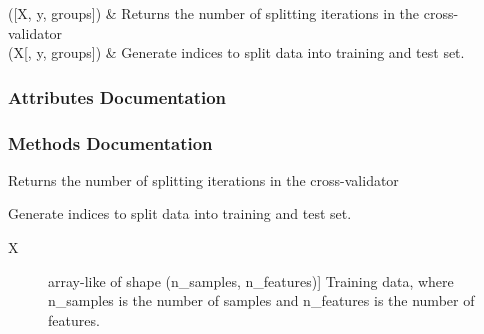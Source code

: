 \documentclass[letterpaper,10pt,english]{sphinxmanual}
\begin{document}
\begin{fulllineitems}
\begin{savenotes}
\begin{longtable}[c]{}
\endlastfoot

{\hyperref[\detokenize{api/mastml.data_splitters.Bootstrap:mastml.data_splitters.Bootstrap.get_n_splits}]{}}({[}X, y, groups{]})
&
Returns the number of splitting iterations in the cross-validator
\\
\hline
{\hyperref[\detokenize{api/mastml.data_splitters.Bootstrap:mastml.data_splitters.Bootstrap.split}]{}}(X{[}, y, groups{]})
&
Generate indices to split data into training and test set.
\\
\hline
\end{longtable}\sphinxatlongtableend\end{savenotes}
\subsubsection*{Attributes Documentation}

\begin{fulllineitems}
\label{\detokenize{api/mastml.data_splitters.Bootstrap:mastml.data_splitters.Bootstrap.indices}}
\end{fulllineitems}

\subsubsection*{Methods Documentation}

\begin{fulllineitems}
\label{\detokenize{api/mastml.data_splitters.Bootstrap:mastml.data_splitters.Bootstrap.get_n_splits}}
Returns the number of splitting iterations in the cross-validator

\end{fulllineitems}


\begin{fulllineitems}
\label{\detokenize{api/mastml.data_splitters.Bootstrap:mastml.data_splitters.Bootstrap.split}}
Generate indices to split data into training and test set.
\begin{description}
\item[{X}] \leavevmode{[}array-like of shape (n\_samples, n\_features){]}
Training data, where n\_samples is the number of samples
and n\_features is the number of features.


\end{description}
\end{fulllineitems}
\end{fulllineitems}
\end{document}
